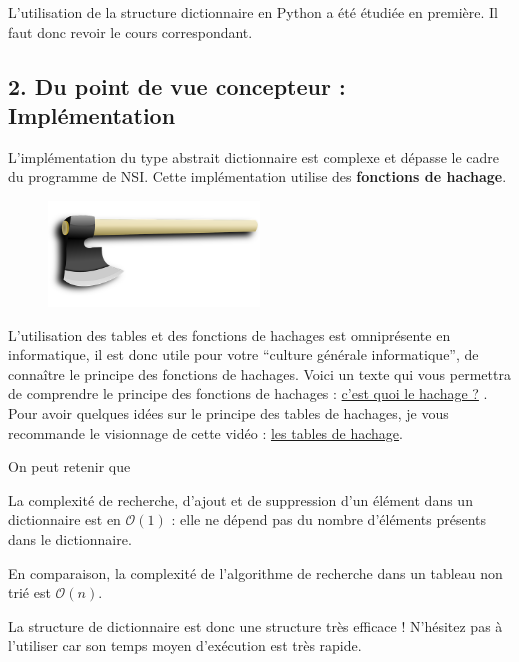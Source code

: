 \documentclass[
  a4paper,
  DIV=11,
  numbers=noendperiod]{scrartcl}
\begin{document}
L'utilisation de la structure dictionnaire en Python a été étudiée en
première. Il faut donc revoir le cours correspondant.

\hypertarget{du-point-de-vue-concepteur-impluxe9mentation}{%
\subsection{2. Du point de vue concepteur :
Implémentation}\label{du-point-de-vue-concepteur-impluxe9mentation}}

L'implémentation du type abstrait dictionnaire est complexe et dépasse
le cadre du programme de NSI. Cette implémentation utilise des
\textbf{fonctions de hachage}.

\begin{figure}

{\centering \includegraphics[width=0.5\textwidth,height=\textheight]{hache.png}

}

\end{figure}

L'utilisation des tables et des fonctions de hachages est omniprésente
en informatique, il est donc utile pour votre ``culture générale
informatique'', de connaître le principe des fonctions de hachages.
Voici un texte qui vous permettra de comprendre le principe des
fonctions de hachages :
\href{https://culture-informatique.net/cest-quoi-hachage/}{c'est quoi le
hachage ?} . Pour avoir quelques idées sur le principe des tables de
hachages, je vous recommande le visionnage de cette vidéo :
\href{https://www.youtube.com/watch?v=CkLctGYWFPA}{les tables de
hachage}.

On peut retenir que

\begin{tcolorbox}[enhanced jigsaw, rightrule=.15mm, left=2mm, leftrule=.75mm, arc=.35mm, opacitybacktitle=0.6, colbacktitle=quarto-callout-important-color!10!white, breakable, colback=white, toptitle=1mm, opacityback=0, toprule=.15mm, bottomrule=.15mm, title=\textcolor{quarto-callout-important-color}{\faExclamation}\hspace{0.5em}{À retenir}, titlerule=0mm, bottomtitle=1mm, coltitle=black]

La complexité de recherche, d'ajout et de suppression d'un élément dans
un dictionnaire est en \(\mathcal{O}(1)\) : elle ne dépend pas du nombre
d'éléments présents dans le dictionnaire.

En comparaison, la complexité de l'algorithme de recherche dans un
tableau non trié est \(\mathcal{O}(n)\).

La structure de dictionnaire est donc une structure très efficace !
N'hésitez pas à l'utiliser car son temps moyen d'exécution est très
rapide.

\end{tcolorbox}
\end{document}
